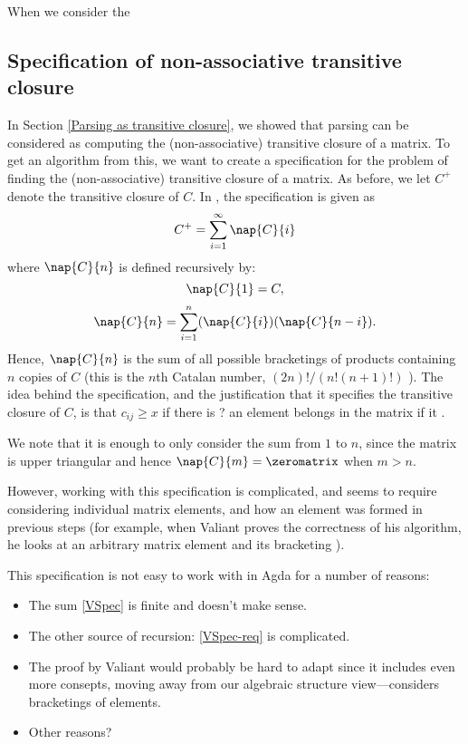 When we consider the 

\subsection{Specification of non-associative transitive closure}
In Section \ref{Parsing as transitive closure}, we showed that parsing can be considered as computing the (non-associative) transitive closure of a matrix. To get an algorithm from this, we want to create a specification for the problem of finding the (non-associative) transitive closure of a matrix. As before, we let $C^+$ denote the transitive closure of $C$. In \cite{Valiant}, the specification is given as 
\begin{equation}
  \label{VSpec}
  C^+ = \sum_{i = 1}^{\infty}\nap{C}{i}
\end{equation}
where $\nap{C}{n}$ is defined recursively by:
\begin{equation}
  \nap{C}{1} = C,
\end{equation}
\begin{equation}
  \label{VSpec-rec}
  \nap{C}{n} = \sum_{i = 1}^n(\nap{C}{i})(\nap{C}{n-i}).
\end{equation}
Hence, $\nap{C}{n}$ is the sum of all possible bracketings of products containing $n$ copies of $C$ (this is the $n$th Catalan number, $(2n)!/(n!(n+1)!)$ \cite{mathworld-catalan}).
The idea behind the specification, and the justification that it specifies the transitive closure of $C$, is that $c_{ij} \ge x$ if there is ? an element belongs in the matrix if it .

We note that it is enough to only consider the sum from $1$ to $n$, since the matrix is upper triangular and hence $\nap{C}{m} = \zeromatrix$ when $m > n$.

However, working with this specification is complicated, and seems to require considering individual matrix elements, and how an element was formed in previous steps (for example, when Valiant proves the correctness of his algorithm, he looks at an arbitrary matrix element and its bracketing \cite{Valiant} ). 

This specification is not easy to work with in Agda for a number of reasons:
\begin{itemize}
\item The sum \eqref{VSpec} is finite and doesn't make sense.
\item The other source of recursion: \eqref{VSpec-req} is complicated.
\item The proof by Valiant would probably be hard to adapt since it includes even more consepts, moving away from our algebraic structure view---considers bracketings of elements.
\item Other reasons?
\end{itemize}

